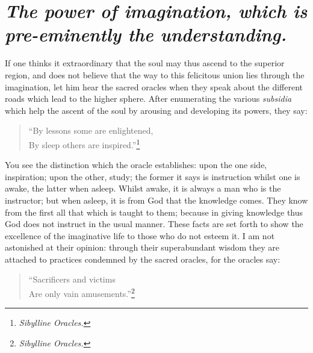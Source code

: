 \documentclass[12pt]{article}
\begin{document}
\section{\mdseries\itshape The power of imagination, which is pre-eminently the
understanding.}

If one thinks it extraordinary that the soul may thus ascend to the superior
region, and does not believe that the way to this felicitous union lies through
the imagination, let him hear the sacred oracles when they speak about the
different roads which lead to the higher sphere. After enumerating the various
\textit{subsidia} which help the ascent of the soul by arousing and developing
its powers, they say:

\begin{verse}
``By lessons some are enlightened,\\
By sleep others are inspired.''\footnote{\textit{Sibylline Oracles.}}
\end{verse}

\noindent You see the distinction which the oracle establishes: upon the one
side, inspiration; upon the other, study; the former it says is instruction
whilst one is awake, the latter when asleep. Whilst awake, it is always a man
who is the instructor; but when asleep, it is from God that the knowledge
comes. They know from the first all that which is taught to them; because in
giving knowledge thus God does not instruct in the usual manner. These facts
are set forth to show the excellence of the imaginative life to those who do
not esteem it. I am not astonished at their opinion: through their
superabundant wisdom they are attached to practices condemned by the sacred
oracles, for the oracles say:

\begin{verse}
``Sacrificers and victims\\
Are only vain amusements.''\footnote{\textit{Sibylline Oracles.}}
\end{verse}
\end{document}
